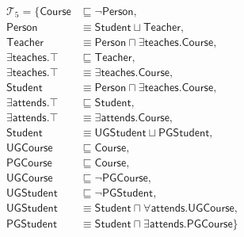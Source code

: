 \documentclass{amsart}
\begin{document}
     \begin{align*}
  \mathcal{T}_5 = \{\mathsf{Course} &\sqsubseteq \neg \mathsf{Person},\\
  \mathsf{Person} &\equiv \mathsf{Student} \sqcup \mathsf{Teacher}, \\ 
  \mathsf{Teacher} &\equiv \mathsf{Person} \sqcap \exists\mathsf{teaches}.\mathsf{Course}, \\
  \exists\mathsf{teaches}.\top &\sqsubseteq \mathsf{Teacher},\\
  \exists\mathsf{teaches}.\top &\equiv \exists\mathsf{teaches}.\mathsf{Course},\\
  \mathsf{Student} &\equiv \mathsf{Person} \sqcap \exists\mathsf{teaches}.\mathsf{Course}, \\
  \exists\mathsf{attends}.\top &\sqsubseteq \mathsf{Student},\\ 
  \exists\mathsf{attends}.\top &\equiv \exists\mathsf{attends}.\mathsf{Course},\\
  \mathsf{Student} &\equiv \mathsf{UGStudent} \sqcup \mathsf{PGStudent}, \\
  \mathsf{UGCourse} &\sqsubseteq \mathsf{Course},\\
  \mathsf{PGCourse} &\sqsubseteq \mathsf{Course},\\
  \mathsf{UGCourse} &\sqsubseteq \neg\mathsf{PGCourse},\\
  \mathsf{UGStudent} &\sqsubseteq \neg\mathsf{PGStudent},\\
  \mathsf{UGStudent} &\equiv\mathsf{Student} \sqcap  \forall\mathsf{attends}.\mathsf{UGCourse},\\
  \mathsf{PGStudent} &\equiv \mathsf{Student} \sqcap \exists\mathsf{attends}.\mathsf{PGCourse}\}
  \end{align*} 
\end{document}
